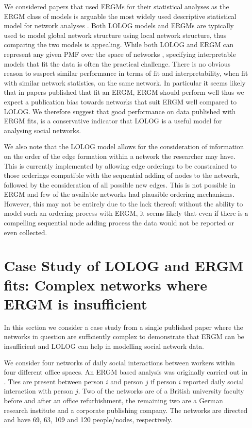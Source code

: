 \documentclass[
]{statsoc}
\begin{document}
We considered papers that used ERGMs for their statistical analyses as
the ERGM class of models is arguable the most widely used descriptive
statistical model for network analyses \citep{Amati2018}. Both LOLOG
models and ERGMs are typically used to model global network structure
using local network structure, thus comparing the two models is
appealing. While both LOLOG and ERGM can represent any given PMF over
the space of networks \citep{Fellows2018}, specifying interpretable
models that fit the data is often the practical challenge. There is no
obvious reason to suspect similar performance in terms of fit and
interpretability, when fit with similar network statistics, on the same
network. In particular it seems likely that in papers published that fit
an ERGM, ERGM should perform well thus we expect a publication bias
towards networks that suit ERGM well compared to LOLOG. We therefore
suggest that good performance on data published with ERGM fits, is a
conservative indicator that LOLOG is a useful model for analysing social
networks.

We also note that the LOLOG model allows for the consideration of
information on the order of the edge formation within a network the
researcher may have. This is currently implemented by allowing edge
orderings to be constrained to those orderings compatible with the
sequential adding of nodes to the network, followed by the consideration
of all possible new edges. This is not possible in ERGM and few of the
available networks had plausible ordering mechanisms. However, this may
not be entirely due to the lack thereof: without the ability to model
such an ordering process with ERGM, it seems likely that even if there
is a compelling sequential node adding process the data would not be
reported or even collected.

\section{Case Study of LOLOG and ERGM fits: Complex networks where ERGM is insufficient}\label{sec:offices}

In this section we consider a case study from a single published paper
where the networks in question are sufficiently complex to demonstrate
that ERGM can be insufficient and LOLOG can help in modelling social
network data.

We consider four networks of daily social interactions between workers
within four different office spaces. An ERGM based analysis was
originally carried out in \cite{Sailer2012}. Ties are present between
person \(i\) and person \(j\) if person \(i\) reported daily social
interaction with person \(j\). Two of the networks are of a British
university faculty before and after an office refurbishment, the
remaining two are a German research institute and a corporate publishing
company. The networks are directed and have 69, 63, 109 and 120
people/nodes, respectively.
\end{document}
